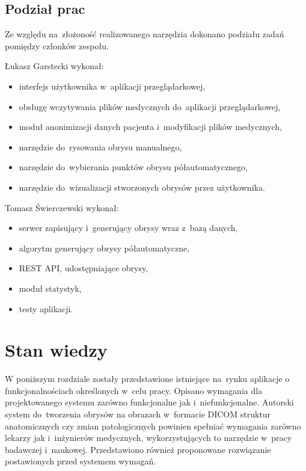 \documentclass[a4paper,11pt,twoside,openright]{report}
\theoremstyle{definition}
\begin{document}
\section {Podział prac}

Ze względu na~złożoność realizowanego narzędzia dokonano podziału zadań pomiędzy
członków zespołu.

Łukasz Garstecki wykonał:

\begin{itemize}[noitemsep]
\item interfejs użytkownika w~aplikacji przeglądarkowej,
\item obsługę wczytywania plików medycznych do~aplikacji przeglądarkowej,
\item moduł anonimizacji danych pacjenta i~modyfikacji plików medycznych,
\item narzędzie do~rysowania obrysu manualnego,
\item narzędzie do~wybierania punktów obrysu półautomatycznego,
\item narzędzie do~wizualizacji stworzonych obrysów przez użytkownika.
\end{itemize}

Tomasz Świerczewski wykonał:

\begin{itemize}[noitemsep]
\item serwer zapisujący i~generujący obrysy wraz z~bazą danych,
\item algorytm generujący obrysy półautomatyczne,
\item REST API, udostępniające obrysy,
\item moduł statystyk,
\item testy aplikacji.
\end{itemize}


\chapter {Stan wiedzy}

W poniższym rozdziale zostały przedstawione istniejące na~rynku aplikacje o
funkcjonalnościach określonych w~celu pracy. Opisano wymagania dla projektowanego systemu
zarówno funkcjonalne jak i~niefunkcjonalne. Autorski system do~tworzenia obrysów
na obrazach w~formacie DICOM struktur anatomicznych czy zmian patologicznych
powinien spełniać wymagania zarówno lekarzy jak i~inżynierów medycznych, wykorzystujących
to narzędzie w~pracy badawczej i~naukowej. Przedstawiono również proponowane rozwiązanie
postawionych przed systemem wymagań.
\end{document}
